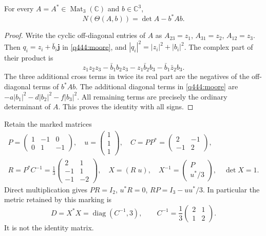 \begin{lemma}\label{q444:pair-cubic}
For every $A=A^*\in\operatorname{Mat}_3(\mathbb C)$ and $b\in\mathbb C^3$,
\begin{equation}\label{q444:pair}
 N(\Theta(A,b))=\det A-b^*Ab.
\end{equation}
\end{lemma}
\begin{proof}
Write the cyclic off-diagonal entries of $A$ as
$A_{23}=z_1$, $A_{31}=z_2$, $A_{12}=z_3$. Then
$q_i=z_i+\bar b_i\mathbf j$ in \eqref{q444:moore}, and
$|q_i|^2=|z_i|^2+|b_i|^2$. The complex part of their product is
\[
 z_1z_2z_3-\bar b_1b_2z_3-z_1\bar b_2b_3-\bar b_1\bar z_2b_3.
\]
The three additional cross terms in twice its real part are the negatives
of the off-diagonal terms of $b^*Ab$. The additional diagonal terms in
\eqref{q444:moore} are
$-a|b_1|^2-d|b_2|^2-f|b_3|^2$. All remaining terms are precisely
the ordinary determinant of $A$. This proves the identity with all signs.
\end{proof}

Retain the marked matrices
\begin{equation}\label{q444:marking}
 \begin{gathered}
 P=\begin{pmatrix}1&-1&0\\0&1&-1\end{pmatrix},\quad
 u=\begin{pmatrix}1\\1\\1\end{pmatrix},\quad
 C=PP^*=\begin{pmatrix}2&-1\\-1&2\end{pmatrix},\\
 R=P^*C^{-1}=\frac13\begin{pmatrix}2&1\\-1&1\\-1&-2\end{pmatrix},
 \quad X=(R\;u),\quad
 X^{-1}=\begin{pmatrix}P\\u^*/3\end{pmatrix},\quad \det X=1.
 \end{gathered}
\end{equation}
Direct multiplication gives $PR=I_2$, $u^*R=0$,
$RP=I_3-uu^*/3$. In particular the metric retained by this marking is
\begin{equation}\label{q444:D}
 D=X^*X=\operatorname{diag}(C^{-1},3),\qquad
 C^{-1}=\frac13\begin{pmatrix}2&1\\1&2\end{pmatrix}.
\end{equation}
It is not the identity matrix.

